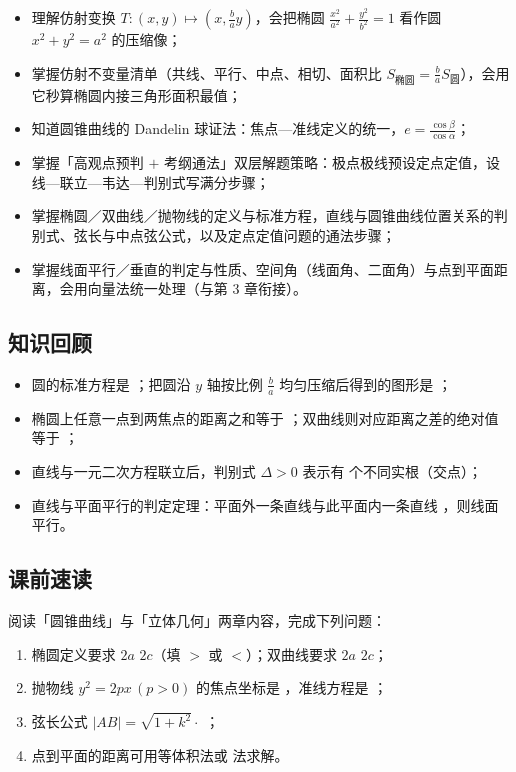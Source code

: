 \begin{learnobjective}
\begin{itemize}
  \item 理解仿射变换 $T:(x,y)\mapsto\left(x,\frac{b}{a}y\right)$，会把椭圆 $\frac{x^2}{a^2}+\frac{y^2}{b^2}=1$ 看作圆 $x^2+y^2=a^2$ 的压缩像；
  \item 掌握仿射不变量清单（共线、平行、中点、相切、面积比 $S_{\text{椭圆}}=\frac{b}{a}S_{\text{圆}}$），会用它秒算椭圆内接三角形面积最值；
  \item 知道圆锥曲线的 Dandelin 球证法：焦点—准线定义的统一，$e=\frac{\cos\beta}{\cos\alpha}$；
  \item 掌握「高观点预判 $+$ 考纲通法」双层解题策略：极点极线预设定点定值，设线—联立—韦达—判别式写满分步骤；
  \item 掌握椭圆／双曲线／抛物线的定义与标准方程，直线与圆锥曲线位置关系的判别式、弦长与中点弦公式，以及定点定值问题的通法步骤；
  \item 掌握线面平行／垂直的判定与性质、空间角（线面角、二面角）与点到平面距离，会用向量法统一处理（与第 3 章衔接）。
\end{itemize}
\end{learnobjective}

\begin{preview}
\subsection*{知识回顾}
\begin{itemize}
  \item 圆的标准方程是 \blank；把圆沿 $y$ 轴按比例 $\frac{b}{a}$ 均匀压缩后得到的图形是 \blank；
  \item 椭圆上任意一点到两焦点的距离之和等于 \blank；双曲线则对应距离之差的绝对值等于 \blank；
  \item 直线与一元二次方程联立后，判别式 $\Delta>0$ 表示有 \blank 个不同实根（交点）；
  \item 直线与平面平行的判定定理：平面外一条直线与此平面内一条直线 \blank，则线面平行。
\end{itemize}

\subsection*{课前速读}
阅读「圆锥曲线」与「立体几何」两章内容，完成下列问题：
\begin{enumerate}
  \item 椭圆定义要求 $2a$ \blank $2c$（填 $>$ 或 $<$）；双曲线要求 $2a$ \blank $2c$；
  \item 抛物线 $y^2=2px\,(p>0)$ 的焦点坐标是 \blank，准线方程是 \blank；
  \item 弦长公式 $|AB|=\sqrt{1+k^2}\cdot$ \blank；
  \item 点到平面的距离可用等体积法或 \blank 法求解。
\end{enumerate}
\end{preview}

